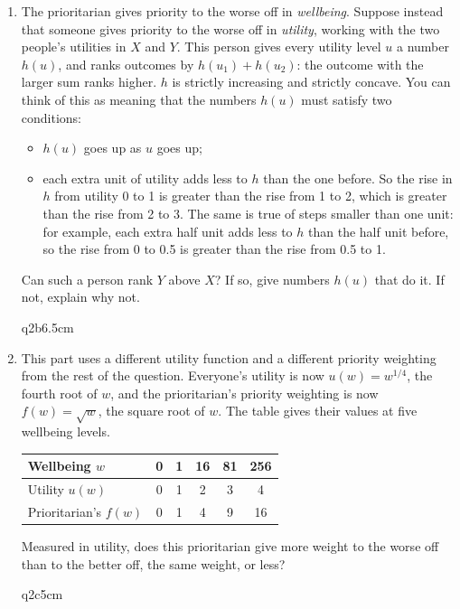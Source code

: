 \begin{Form}
\begin{enumerate}
  \item The prioritarian gives priority to the worse off in \emph{wellbeing}. Suppose
  instead that someone gives priority to the worse off in \emph{utility}, working with the
  two people's utilities in $X$ and $Y$. This person gives every
  utility level $u$ a number $h(u)$, and ranks outcomes by $h(u_1) + h(u_2)$: the outcome
  with the larger sum ranks higher. $h$ is strictly increasing and strictly concave. You can think of this as
  meaning that the numbers $h(u)$ must satisfy two conditions:
  \begin{itemize}
    \item $h(u)$ goes up as $u$ goes up;
    \item each extra unit of utility adds less to $h$ than the one before. So the rise in
    $h$ from utility 0 to 1 is greater than the rise from 1 to 2, which is greater than the
    rise from 2 to 3. The same is true of steps smaller than one unit: for example, each
    extra half unit adds less to $h$ than the half unit before, so the rise from 0 to 0.5 is
    greater than the rise from 0.5 to 1.
  \end{itemize}
  Can such a person rank $Y$ above $X$? If so, give numbers $h(u)$ that do it. If
  not, explain why not.
\begin{answer}{q2b}{6.5cm}
\end{answer}


  \item This part uses a different utility function and a different priority weighting
  from the rest of the question. Everyone's utility is now $u(w) = w^{1/4}$, the fourth
  root of $w$, and the prioritarian's priority weighting is now $f(w) = \sqrt{w}$, the square
  root of $w$. The table gives their values at five wellbeing levels.
  \begin{center}
  \begin{tabular}{lccccc}
  \toprule
  Wellbeing $w$ & 0 & 1 & 16 & 81 & 256 \\
  \midrule
  Utility $u(w)$ & 0 & 1 & 2 & 3 & 4 \\
  Prioritarian's $f(w)$ & 0 & 1 & 4 & 9 & 16 \\
  \bottomrule
  \end{tabular}
  \end{center}
  Measured in utility, does this prioritarian give more weight to the worse off than to
  the better off, the same weight, or less?
\begin{answer}{q2c}{5cm}
\end{answer}


\end{enumerate}
\end{Form}
